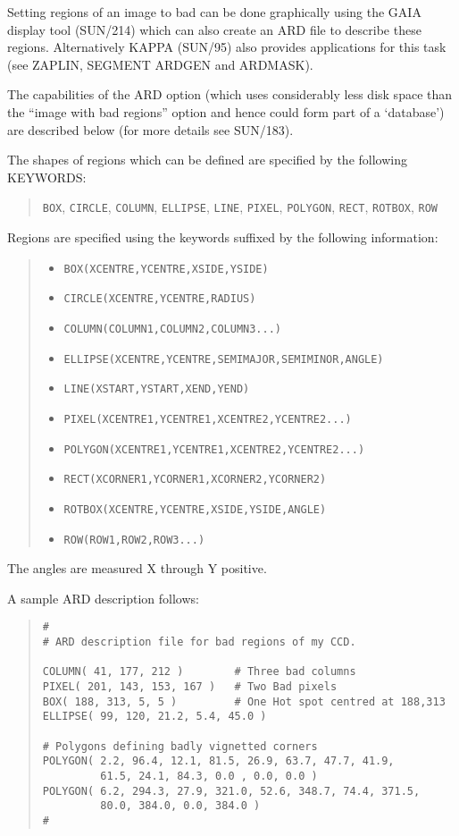 \documentclass[twoside,11pt]{article}
\newcommand{\xref}[3]{#1}
\renewcommand{\_}{\texttt{\symbol{95}}}
\newenvironment{myquote}{\begin{quote}\begin{small}}{\end{small}\end{quote}}
\newcommand{\text}[1]{{\small \tt #1}}
\begin{document}
Setting regions of an image to bad can be done graphically using the
GAIA display tool (\xref{SUN/214}{sun214}{}) which can also create an
ARD file to describe these regions. Alternatively
\xref{KAPPA (SUN/95)}{sun95}{} also provides applications for this
task (see \xref{ZAPLIN}{sun95}{ZAPLIN}, \xref{SEGMENT}{sun95}{SEGMENT}
\xref{ARDGEN}{sun95}{ARDGEN} and \xref{ARDMASK}{sun95}{ARDMASK}).

The capabilities of the ARD option (which uses considerably less disk
space than the ``image with bad regions'' option and hence could form
part of a `database') are described below (for more details see
\xref{SUN/183}{sun183}{}).

The shapes of regions which can be defined are specified by the
following KEYWORDS:
\begin{myquote}
\text{BOX}, \text{CIRCLE}, \text{COLUMN}, \text{ELLIPSE}, \text{LINE},
\text{PIXEL}, \text{POLYGON}, \text{RECT}, \text{ROTBOX}, \text{ROW}
\end{myquote}

Regions are specified using the keywords suffixed by the following
information:
\begin{myquote}
\begin{itemize}
\item \text{BOX(XCENTRE,YCENTRE,XSIDE,YSIDE)}
\item \text{CIRCLE(XCENTRE,YCENTRE,RADIUS)}
\item \text{COLUMN(COLUMN1,COLUMN2,COLUMN3...)}
\item \text{ELLIPSE(XCENTRE,YCENTRE,SEMIMAJOR,SEMIMINOR,ANGLE)}
\item \text{LINE(XSTART,YSTART,XEND,YEND)}
\item \text{PIXEL(XCENTRE1,YCENTRE1,XCENTRE2,YCENTRE2...)}
\item \text{POLYGON(XCENTRE1,YCENTRE1,XCENTRE2,YCENTRE2...)}
\item \text{RECT(XCORNER1,YCORNER1,XCORNER2,YCORNER2)}
\item \text{ROTBOX(XCENTRE,YCENTRE,XSIDE,YSIDE,ANGLE)}
\item \text{ROW(ROW1,ROW2,ROW3...)}
\end{itemize}
\end{myquote}

The angles are measured X through Y positive.

A sample ARD description follows:
\begin{myquote}
\begin{verbatim}
#
# ARD description file for bad regions of my CCD.

COLUMN( 41, 177, 212 )        # Three bad columns
PIXEL( 201, 143, 153, 167 )   # Two Bad pixels
BOX( 188, 313, 5, 5 )         # One Hot spot centred at 188,313
ELLIPSE( 99, 120, 21.2, 5.4, 45.0 )

# Polygons defining badly vignetted corners
POLYGON( 2.2, 96.4, 12.1, 81.5, 26.9, 63.7, 47.7, 41.9,
         61.5, 24.1, 84.3, 0.0 , 0.0, 0.0 )
POLYGON( 6.2, 294.3, 27.9, 321.0, 52.6, 348.7, 74.4, 371.5,
         80.0, 384.0, 0.0, 384.0 )
#
\end{verbatim}
\end{myquote}
\end{document}
